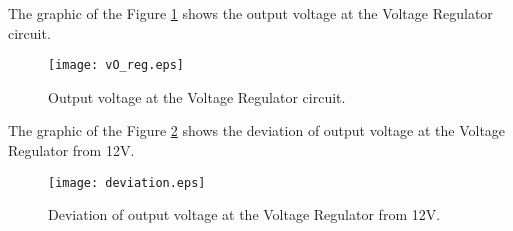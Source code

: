 The graphic of the Figure \ref{fig:vO_reg} shows the output voltage at the Voltage Regulator circuit.

\begin{figure}[H] \centering
  \texttt{[image: vO\_reg.eps]}
  \caption{Output voltage at the Voltage Regulator circuit.}
  \label{fig:vO_reg}
\end{figure} 

The graphic of the Figure \ref{fig:vO-12} shows the deviation of output voltage at the Voltage Regulator from 12V.

\begin{figure}[H] \centering
  \texttt{[image: deviation.eps]}
  \caption{Deviation of output voltage at the Voltage Regulator from 12V.}
  \label{fig:vO-12}
\end{figure} 






